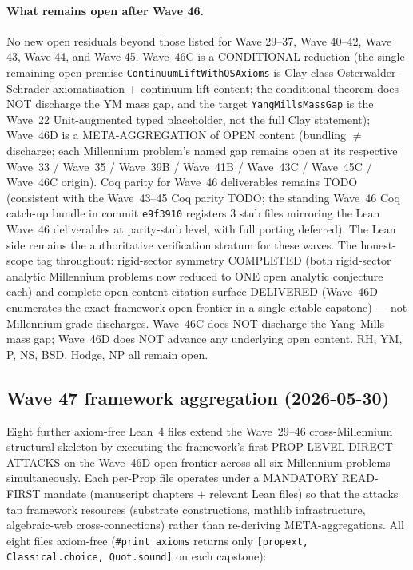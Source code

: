 \paragraph{What remains open after Wave 46.} No new open residuals
beyond those listed for Wave 29--37, Wave 40--42, Wave 43,
Wave 44, and Wave 45. Wave~46C is a CONDITIONAL reduction (the
single remaining open premise \texttt{ContinuumLiftWithOSAxioms}
is Clay-class Osterwalder--Schrader axiomatisation + continuum-lift
content; the conditional theorem does NOT discharge the YM mass
gap, and the target \texttt{YangMillsMassGap} is the Wave~22
Unit-augmented typed placeholder, not the full Clay statement);
Wave~46D is a META-AGGREGATION of OPEN content (bundling $\neq$
discharge; each Millennium problem's named gap remains open at
its respective Wave~33 / Wave~35 / Wave~39B / Wave~41B / Wave~43C
/ Wave~45C / Wave~46C origin). Coq parity for Wave~46 deliverables
remains TODO (consistent with the Wave~43--45 Coq parity TODO;
the standing Wave~46 Coq catch-up bundle in commit \texttt{e9f3910}
registers 3 stub files mirroring the Lean Wave~46 deliverables at
parity-stub level, with full porting deferred). The Lean side
remains the authoritative verification stratum for these waves.
The honest-scope tag throughout: rigid-sector symmetry COMPLETED
(both rigid-sector analytic Millennium problems now reduced to
ONE open analytic conjecture each) and complete open-content
citation surface DELIVERED (Wave~46D enumerates the exact
framework open frontier in a single citable capstone) --- not
Millennium-grade discharges. Wave~46C does NOT discharge the
Yang--Mills mass gap; Wave~46D does NOT advance any underlying
open content. RH, YM, P, NS, BSD, Hodge, NP all remain open.

\subsection{Wave 47 framework aggregation (2026-05-30)}
\label{subsec:wave47-aggregation}

Eight further axiom-free Lean~4 files extend the Wave~29--46
cross-Millennium structural skeleton by executing the framework's
first PROP-LEVEL DIRECT ATTACKS on the Wave~46D open frontier
across all six Millennium problems simultaneously. Each per-Prop
file operates under a MANDATORY READ-FIRST mandate (manuscript
chapters $+$ relevant Lean files) so that the attacks tap framework
resources (substrate constructions, mathlib infrastructure,
algebraic-web cross-connections) rather than re-deriving
META-aggregations. All eight files axiom-free
(\texttt{\#print axioms} returns only
\texttt{[propext, Classical.choice, Quot.sound]} on each capstone):


